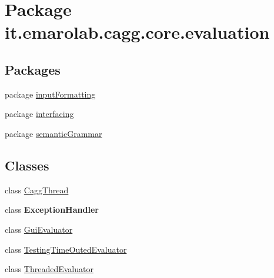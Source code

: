 \hypertarget{namespaceit_1_1emarolab_1_1cagg_1_1core_1_1evaluation}{\section{Package it.\-emarolab.\-cagg.\-core.\-evaluation}
\label{namespaceit_1_1emarolab_1_1cagg_1_1core_1_1evaluation}
}
\subsection*{Packages}
\begin{DoxyCompactItemize}
\item 
package \hyperlink{namespaceit_1_1emarolab_1_1cagg_1_1core_1_1evaluation_1_1inputFormatting}{input\-Formatting}
\item 
package \hyperlink{namespaceit_1_1emarolab_1_1cagg_1_1core_1_1evaluation_1_1interfacing}{interfacing}
\item 
package \hyperlink{namespaceit_1_1emarolab_1_1cagg_1_1core_1_1evaluation_1_1semanticGrammar}{semantic\-Grammar}
\end{DoxyCompactItemize}
\subsection*{Classes}
\begin{DoxyCompactItemize}
\item 
class \hyperlink{classit_1_1emarolab_1_1cagg_1_1core_1_1evaluation_1_1CaggThread}{Cagg\-Thread}
\item 
class {\bfseries Exception\-Handler}
\item 
class \hyperlink{classit_1_1emarolab_1_1cagg_1_1core_1_1evaluation_1_1GuiEvaluator}{Gui\-Evaluator}
\item 
class \hyperlink{classit_1_1emarolab_1_1cagg_1_1core_1_1evaluation_1_1TestingTimeOutedEvaluator}{Testing\-Time\-Outed\-Evaluator}
\item 
class \hyperlink{classit_1_1emarolab_1_1cagg_1_1core_1_1evaluation_1_1ThreadedEvaluator}{Threaded\-Evaluator}
\end{DoxyCompactItemize}
